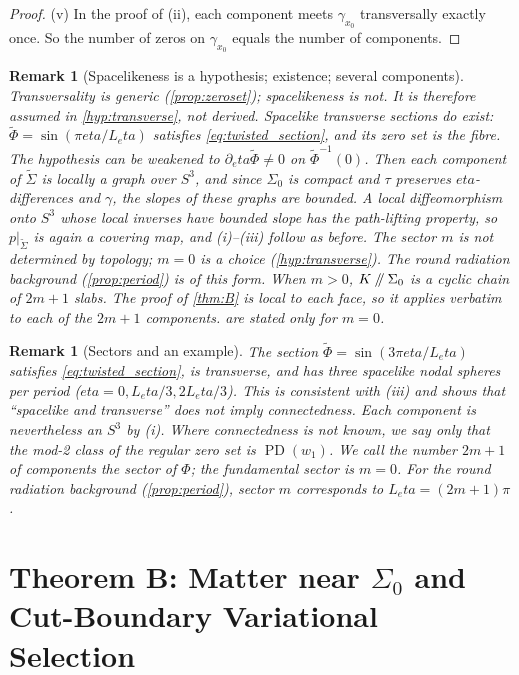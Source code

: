 \documentclass[11pt]{article}
\theoremstyle{canonmath}
\newtheorem{remark}[theorem]{Remark}
\theoremstyle{canonpostulate}
\theoremstyle{canonproposition}
\theoremstyle{canonmath}
\theoremstyle{canonproposition}
\providecommand{\cutK}{\Klein\mathbin{/\mkern-5mu/}\Sigma_0}
\providecommand{\PD}{\operatorname{PD}}
\providecommand{\Klein}{\mathcal{K}}
\def\mathcal#1{#1}%
\def\eta{eta}%
\begin{document}
\begin{proof}
(v) In the proof of (ii), each component meets $\gamma_{x_0}$ transversally exactly once. So the number of zeros on $\gamma_{x_0}$ equals the number of components.
\end{proof}

\begin{remark}[Spacelikeness is a hypothesis; existence; several components]\label{rem:spacelike}
Transversality is generic (\cref{prop:zeroset}); spacelikeness is not. It is therefore assumed in \ref{hyp:transverse}, not derived. Spacelike transverse sections do exist: $\widetilde\Phi = \sin(\pi\eta/L_\eta)$ satisfies \eqref{eq:twisted_section}, and its zero set is the fibre. The hypothesis can be weakened to $\partial_\eta\widetilde\Phi\neq0$ on $\widetilde\Phi^{-1}(0)$. Then each component of $\widetilde\Sigma$ is locally a graph over $S^3$, and since $\Sigma_0$ is compact and $\tau$ preserves $\eta$-differences and $\gamma$, the slopes of these graphs are bounded. A local diffeomorphism onto $S^3$ whose local inverses have bounded slope has the path-lifting property, so $p|_{\widetilde\Sigma}$ is again a covering map, and (i)--(iii) follow as before. The sector $m$ is not determined by topology; $m=0$ is a choice (\ref{hyp:transverse}). The round radiation background (\cref{prop:period}) is of this form. When $m>0$, $\cutK$ is a cyclic chain of $2m+1$ slabs. The proof of \cref{thm:B} is local to each face, so it applies verbatim to each of the $2m+1$ components.  are stated only for $m=0$.
\end{remark}

\begin{remark}[Sectors and an example]
The section $\widetilde\Phi = \sin(3\pi\eta/L_\eta)$ satisfies \eqref{eq:twisted_section}, is transverse, and has three spacelike nodal spheres per period ($\eta = 0, L_\eta/3, 2L_\eta/3$). This is consistent with (iii) and shows that ``spacelike and transverse'' does not imply connectedness. Each component is nevertheless an $S^3$ by (i). Where connectedness is not known, we say only that the mod-2 class of the regular zero set is $\PD(w_1)$. We call the number $2m+1$ of components the \emph{sector} of $\Phi$; the fundamental sector is $m = 0$. For the round radiation background (\cref{prop:period}), sector $m$ corresponds to $L_\eta = (2m+1)\pi$.
\end{remark}

\section{Theorem B: Matter near \texorpdfstring{$\Sigma_0$}{Sigma0} and Cut-Boundary Variational Selection}
\label{sec:B}
\end{document}
